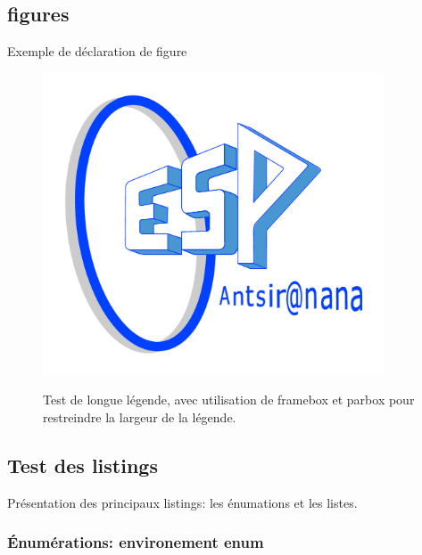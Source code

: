 \documentclass[a4paper, oneside, 12pt, memoireMaitrise, francais, creativecommons, hyperref]{memoESPA}
\begin{document}
\subsection{figures}
    Exemple de déclaration de figure
    \begin{figure}
    	\centering %
    		\includegraphics[width=0.9\textwidth]{figures/logoESPA.png} %
    	 \\ \parbox{0.75\textwidth}{\caption{Test de longue légende, avec utilisation de framebox et parbox pour restreindre la largeur de la légende.}\label{fig:vueEts}} %
    \end{figure}


\subsection{Test des listings}

Présentation des principaux listings: les énumations et les listes.

\subsubsection{Énumérations: environement enum}
\end{document}
